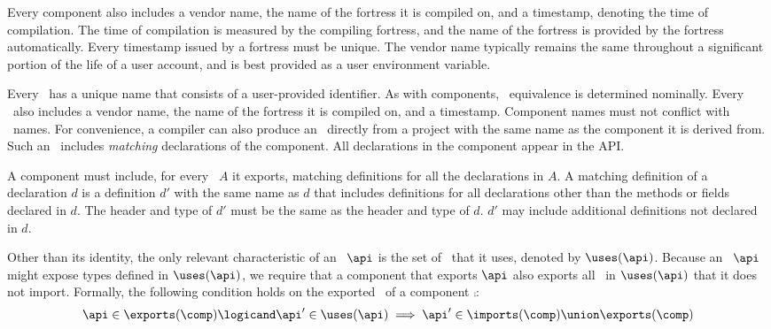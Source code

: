 Every component also includes
a vendor name,
the name of the fortress it is compiled on, and
a timestamp, denoting the time of compilation.
The time of compilation is measured by the compiling fortress,
and the name of the fortress is provided by the fortress automatically.
Every timestamp issued by a fortress must be unique.
The vendor name typically remains the same throughout a significant
portion of the life of a
user account, and is best provided as a user environment variable.

Every \apiN\ has a unique name that consists of a user-provided identifier.
As with components,
\apiN\ equivalence is determined nominally.
Every \apiN\ also includes a vendor name,
the name of the fortress it is compiled on,
and a timestamp.
Component names must not conflict with \apiN\ names.
For convenience, a compiler can also
produce an \apiN\ directly from a project
with the same name as the component it is derived from.
Such an \apiN\ includes \emph{matching} declarations of the component.
All declarations in the component appear in the API.


A component must include, for every \apiN\ $A$ it exports,
matching definitions for all the declarations in $A$.
A matching definition of a declaration $d$
is a definition $d'$ with the same name as $d$
that includes definitions for all declarations
other than the methods or fields declared  in $d$.
The header and type of $d'$ must be the same as the header and type of $d$.
$d'$ may include additional definitions not declared in $d$.

Other than its identity,
the only relevant characteristic of an \apiN\ $\api$
is the set of \apisN\ that it uses,
denoted by $\uses(\api)$.
Because an \apiN\ $\api$ might expose types
defined in $\uses(\api)$,
we require that a component that exports $\api$
also exports all \apisN\ in $\uses(\api)$ that it does not import.
Formally, the following condition holds on the exported \apisN\
of a component $\comp$:
\[
\api \in \exports(\comp) \logicand \api' \in \uses(\api)
        \implies \api' \in \imports(\comp) \union \exports(\comp)
\]
